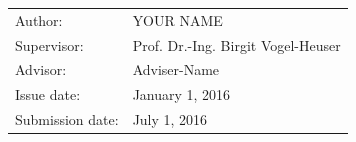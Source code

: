 \begin{titlepage}
	\vspace*{\fill}
	
	\normalsize
	\begin{flushleft}
		\begin{tabular}{l l}
			Author:					& YOUR NAME				\\[-0.1cm]
			Supervisor:     		& Prof. Dr.-Ing. Birgit Vogel-Heuser\\[-0.1cm]
			Advisor:				& Adviser-Name\\[-0.1cm]
			Issue date:        		& {January 1, 2016} \\[-0.1cm]
			Submission date:        & {July 1, 2016} \\[-0.1cm]
		\end{tabular}
	\end{flushleft}
\end{titlepage}	